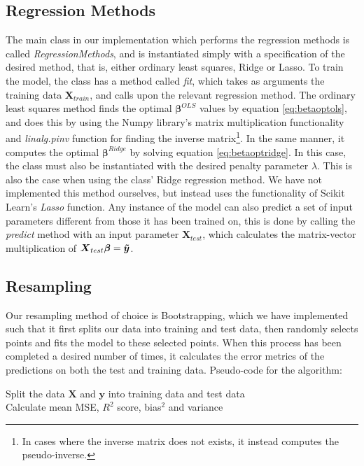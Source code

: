 \subsection{Regression Methods}
The main class in our implementation which performs the regression methods is called \textit{RegressionMethods}, and is instantiated simply with a specification of the desired method, that is, either ordinary least squares, Ridge or Lasso. To train the model, the class has a method called \textit{fit}, which takes as arguments the training data $\boldsymbol{X}_{train}$, and calls upon the relevant regression method. The ordinary least squares method finds the optimal $\boldsymbol{\beta}^{OLS}$ values by equation \ref{eq:betaoptols}, and does this by using the Numpy library's matrix multiplication functionality and \textit{linalg.pinv} function for finding the inverse matrix\footnote{In cases where the inverse matrix does not exists, it instead computes the pseudo-inverse.}. In the same manner, it computes the optimal $\boldsymbol{\beta}^{Ridge}$ by solving equation \ref{eq:betaoptridge}. In this case, the class must also be instantiated with the desired penalty parameter $\lambda$. This is also the case when using the class' Ridge regression method. We have not implemented this method ourselves, but instead uses the functionality of Scikit Learn's \textit{Lasso} function. Any instance of the model can also predict a set of input parameters different from those it has been trained on, this is done by calling the \textit{predict} method with an input parameter $\boldsymbol{X}_{test}$, which calculates the matrix-vector multiplication of $\boldsymbol{X}_{test}\boldsymbol{\beta} = \boldsymbol{\Tilde{y}}$.

\subsection{Resampling}
Our resampling method of choice is Bootstrapping, which we have implemented such that it first splits our data into training and test data, then randomly selects points and fits the model to these selected points. When this process has been completed a desired number of times, it calculates the error metrics of the predictions on both the test and training data. Pseudo-code for the algorithm:
\begin{algorithm}[!h]
{Split the data $\boldsymbol{X}$ and $\boldsymbol{y}$ into training data and test data}\\
{Calculate mean MSE, $R^2$ score, bias$^2$ and variance}
\end{algorithm}

